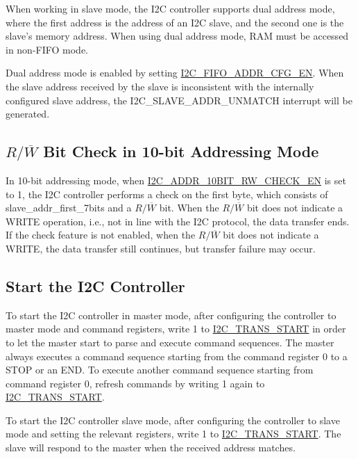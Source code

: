 \documentclass[main\_\_EN.tex]{subfiles}
\begin{document}
When working in slave mode, the I2C controller supports dual address mode, where the first address is the address of an I2C slave, and the second one is the slave's memory address. When using dual address mode, RAM must be accessed in non-FIFO mode.

Dual address mode is enabled by setting \hyperref[fielddesc:I2CFIFOADDRCFGEN]{I2C\_FIFO\_ADDR\_CFG\_EN}. When the slave address received by the slave is inconsistent with the internally configured slave address, the I2C\_SLAVE\_ADDR\_UNMATCH interrupt will be generated.

\subsection{\texorpdfstring{$R/\overline W$ Bit Check in 10-bit Addressing Mode}{R/W Bit Check in 10-bit Addressing Mode}}

In 10-bit addressing mode, when \hyperref[fielddesc:I2CADDR10BITRWCHECKEN]{I2C\_ADDR\_10BIT\_RW\_CHECK\_EN} is set to 1, the I2C controller performs a check on the first byte, which consists of slave\_addr\_first\_7bits and a $R/\overline W$ bit. When the $R/\overline W$ bit does not indicate a WRITE operation, i.e., not in line with the I2C protocol, the data transfer ends. If the check feature is not enabled, when the $R/\overline W$ bit does not indicate a WRITE, the data transfer still continues, but transfer failure may occur.

\subsection{Start the I2C Controller}
\label{subsubsec:i2c-start}

To start the I2C controller in master mode, after configuring the controller to master mode and command registers, write 1 to \hyperref[fielddesc:I2CTRANSSTART]{I2C\_TRANS\_START} in order to let the master start to parse and execute command sequences. The master always executes a command sequence starting from the command register 0 to a STOP or an END. To execute another command sequence starting from command register 0, refresh commands by writing 1 again to \hyperref[fielddesc:I2CTRANSSTART]{I2C\_TRANS\_START}.

To start the I2C controller slave mode, after configuring the controller to slave mode and setting the relevant registers, write 1 to \hyperref[fielddesc:I2CTRANSSTART]{I2C\_TRANS\_START}. The slave will respond to the master when the received address matches.
\end{document}
